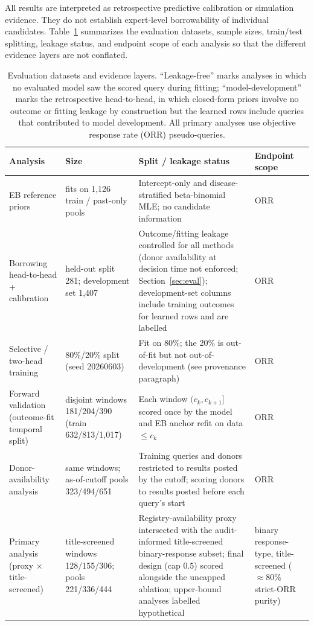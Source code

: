 \documentclass[11pt]{article}
\begin{document}
All results are interpreted as retrospective predictive calibration or
simulation evidence. They do not establish expert-level borrowability of
individual candidates. Table~\ref{tab:datasets} summarizes the evaluation
datasets, sample sizes, train/test splitting, leakage status, and endpoint
scope of each analysis so that the different evidence layers are not conflated.

\begin{table}[htbp]
\centering
\small
\caption{Evaluation datasets and evidence layers. ``Leakage-free'' marks
analyses in which no evaluated model saw the scored query during fitting;
``model-development'' marks the retrospective head-to-head, in which closed-form
priors involve no outcome or fitting leakage by construction but the learned rows include queries
that contributed to model development. All primary analyses use objective
response rate (ORR) pseudo-queries.}
\label{tab:datasets}
\begin{tabular}{p{}p{}p{}p{}}
\toprule
Analysis & Size & Split / leakage status & Endpoint scope \\
\midrule
EB reference priors & fits on 1{,}126 train / past-only pools & Intercept-only and disease-stratified beta-binomial MLE; no candidate information & ORR \\
Borrowing head-to-head + calibration & held-out split 281; development set 1{,}407 & Outcome/fitting leakage controlled for all methods (donor availability at decision time not enforced; Section~\ref{sec:eval}); development-set columns include training outcomes for learned rows and are labelled & ORR \\
Selective / two-head training & 80\%/20\% split (seed 20260603) & Fit on 80\%; the 20\% is out-of-fit but not out-of-development (see provenance paragraph) & ORR \\
Forward validation (outcome-fit temporal split) & disjoint windows 181/204/390 (train 632/813/1{,}017) & Each window $(c_k,c_{k+1}]$ scored once by the model and EB anchor refit on data $\le c_k$ & ORR \\
Donor-availability analysis & same windows; as-of-cutoff pools 323/494/651 & Training queries and donors restricted to results posted by the cutoff; scoring donors to results posted before each query's start & ORR \\
Primary analysis (proxy $\times$ title-screened) & title-screened windows 128/155/306; pools 221/336/444 & Registry-availability proxy intersected with the audit-informed title-screened binary-response subset; final design (cap $0.5$) scored alongside the uncapped ablation; upper-bound analyses labelled hypothetical & binary response-type, title-screened ($\approx 80\%$ strict-ORR purity) \\

\end{tabular}
\end{table}
\end{document}
